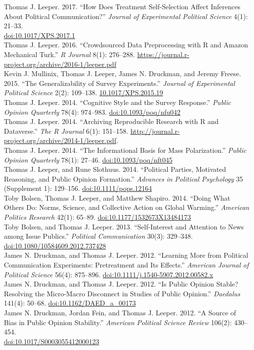 \documentclass[12pt]{article}
\newcommand{\entry}[1]{\indent {\color{lg}\guillemotright}\hspace{2pt}#1\vspace{.25em}\\}
\begin{document}
	\entry{Thomas J. Leeper. 2017. ``How Does Treatment Self-Selection Affect Inferences About Political Communication?'' \textit{Journal of Experimental Political Science} 4(1): 21--33.\\ \href{http://doi.org/10.1017/XPS.2017.1}{doi:10.1017/XPS.2017.1}}
	\entry{Thomas J. Leeper. 2016. ``Crowdsourced Data Preprocessing with R and Amazon Mechanical Turk.'' \textit{R Journal} 8(1): 276--288. \href{https://journal.r-project.org/archive/2016-1/leeper.pdf}{https://journal.r-project.org/archive/2016-1/leeper.pdf}}
	\entry{Kevin J. Mullinix, Thomas J. Leeper, James N. Druckman, and Jeremy Freese. 2015. ``The Generalizability of Survey Experiments.'' \textit{Journal of Experimental Political Science} 2(2): 109--138. \href{http://dx.doi.org/10.1017/XPS.2015.19}{10.1017/XPS.2015.19}}
	\entry{Thomas J. Leeper. 2014. ``Cognitive Style and the Survey Response.'' {\em Public Opinion Quarterly} 78(4): 974--983. \href{http://dx.doi.org/10.1093/poq/nfu042}{doi:10.1093/poq/nfu042}}
	\entry{Thomas J. Leeper. 2014. ``Archiving Reproducible Research with R and Dataverse.'' {\em The R Journal} 6(1): 151--158. \href{http://journal.r-project.org/archive/2014-1/leeper.pdf}{http://journal.r-project.org/archive/2014-1/leeper.pdf}.}
	\entry{Thomas J. Leeper. 2014. ``The Informational Basis for Mass Polarization.'' {\em Public Opinion Quarterly} 78(1): 27--46. \href{http://dx.doi.org/10.1093/poq/nft045}{doi:10.1093/poq/nft045}}
	\entry{Thomas J. Leeper, and Rune Slothuus. 2014. ``Political Parties, Motivated Reasoning, and Public Opinion Formation.'' {\em Advances in Political Psychology} 35 (Supplement 1): 129--156. \href{http://dx.doi.org/10.1111/pops.12164}{doi:10.1111/pops.12164}}
	\entry{Toby Bolsen, Thomas J. Leeper, and Matthew Shapiro. 2014. ``Doing What Others Do: Norms, Science, and Collective Action on Global Warming.'' {\em American Politics Research} 42(1): 65--89. \href{http://dx.doi.org/10.1177/1532673X13484173}{doi:10.1177/1532673X13484173}}
	\entry{Toby Bolsen, and Thomas J. Leeper. 2013. ``Self-Interest and Attention to News among Issue Publics.'' {\em Political Communication} 30(3): 329--348.\\ \href{http://dx.doi.org/10.1080/10584609.2012.737428}{doi:10.1080/10584609.2012.737428}}
	\entry{James N. Druckman, and Thomas J. Leeper. 2012. ``Learning More from Political Communication Experiments: Pretreatment and Its Effects.'' {\em American Journal of Political Science} 56(4): 875--896. \href{http://dx.doi.org/10.1111/j.1540-5907.2012.00582.x}{doi:10.1111/j.1540-5907.2012.00582.x}}
	\entry{James N. Druckman, and Thomas J. Leeper. 2012. ``Is Public Opinion Stable? Resolving the Micro-Macro Disconnect in Studies of Public Opinion.'' {\em Daedalus} 141(4): 50--68. \href{http://dx.doi.org/10.1162/DAED\_a\_00173}{doi:10.1162/DAED\_a\_00173}}
	\entry{James N. Druckman, Jordan Fein, and Thomas J. Leeper. 2012. ``A Source of Bias in Public Opinion Stability.'' {\em American Political Science Review} 106(2): 430--454.\\ \href{http://dx.doi.org/10.1017/S0003055412000123}{doi:10.1017/S0003055412000123}}
\end{document}
